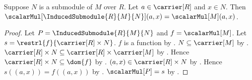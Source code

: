\begin{proposition}\label{induced_submodule_scalar_apply}
    Suppose $N$ is a submodule of $M$ over $R$.
    Let $a\in\carrier[R]$ and $x\in N$.
    Then
        $\scalarMul[\InducedSubmodule{R}{M}{N}](a,x)
            =\scalarMul[M](a,x)$.
\end{proposition}
\begin{proof}
    Let $P=\InducedSubmodule{R}{M}{N}$ and $f=\scalarMul[M]$.
    Let $s=\restrl{f}{\carrier[R]\times N}$.
    $f$ is a function by
        .
    $N\subseteq\carrier[M]$ by .
    $\carrier[R]\times N
        \subseteq\carrier[R]\times\carrier[M]$ by
        .
    Hence $\carrier[R]\times N\subseteq\dom{f}$ by
        .
    $(a,x)\in\carrier[R]\times N$ by .
    Hence $s((a,x))=f((a,x))$ by
        .
    $\scalarMul[P]=s$ by .
\end{proof}

